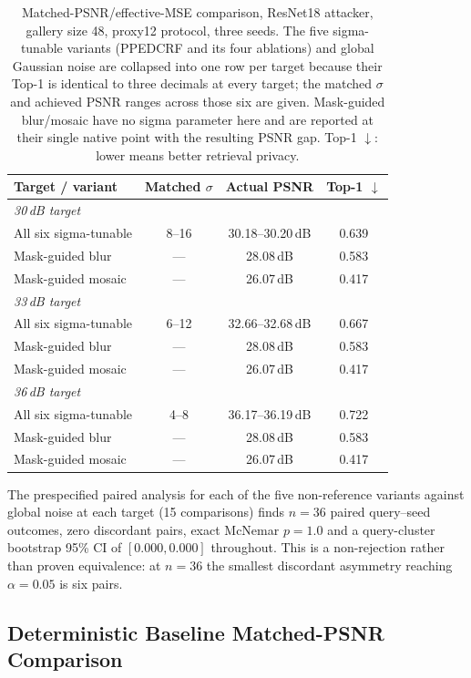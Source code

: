 \documentclass[10pt,journal]{IEEEtran}
\begin{document}
\begin{table}[t]
\centering
\caption{Matched-PSNR/effective-MSE comparison, ResNet18 attacker, gallery size 48, proxy12 protocol, three seeds. The five sigma-tunable variants (PPEDCRF and its four ablations) and global Gaussian noise are collapsed into one row per target because their Top-1 is identical to three decimals at every target; the matched $\sigma$ and achieved PSNR ranges across those six are given. Mask-guided blur/mosaic have no sigma parameter here and are reported at their single native point with the resulting PSNR gap. Top-1 $\downarrow$: lower means better retrieval privacy.}
\label{tab:matched_psnr}
\begin{tabular}{lccc}
\hline
Target / variant & Matched $\sigma$ & Actual PSNR & Top-1 $\downarrow$ \\
\hline
\multicolumn{4}{l}{\emph{30\,dB target}} \\
All six sigma-tunable & 8--16 & 30.18--30.20\,dB & 0.639 \\
Mask-guided blur & --- & 28.08\,dB & 0.583 \\
Mask-guided mosaic & --- & 26.07\,dB & 0.417 \\
\hline
\multicolumn{4}{l}{\emph{33\,dB target}} \\
All six sigma-tunable & 6--12 & 32.66--32.68\,dB & 0.667 \\
Mask-guided blur & --- & 28.08\,dB & 0.583 \\
Mask-guided mosaic & --- & 26.07\,dB & 0.417 \\
\hline
\multicolumn{4}{l}{\emph{36\,dB target}} \\
All six sigma-tunable & 4--8 & 36.17--36.19\,dB & 0.722 \\
Mask-guided blur & --- & 28.08\,dB & 0.583 \\
Mask-guided mosaic & --- & 26.07\,dB & 0.417 \\
\hline
\end{tabular}
\end{table}

The prespecified paired analysis for each of the five non-reference variants
against global noise at each target (15 comparisons) finds $n=36$ paired
query--seed outcomes, zero discordant pairs, exact McNemar $p=1.0$ and a
query-cluster bootstrap 95\% CI of $[0.000,0.000]$ throughout. This is a
non-rejection rather than proven equivalence: at $n=36$ the smallest
discordant asymmetry reaching $\alpha=0.05$ is six pairs.

\subsection{Deterministic Baseline Matched-PSNR Comparison}
\label{sec:deterministic_matched_psnr}
\end{document}
